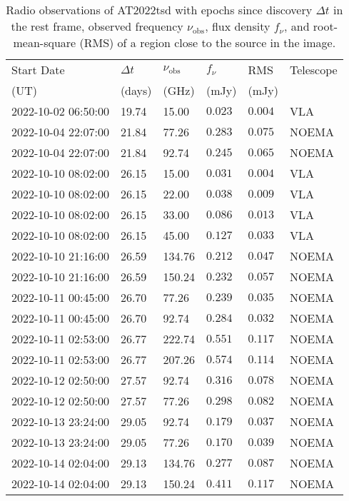 \documentclass{nature_plusfigure}
\begin{document}
\begin{supplement}
\begin{center} 
\begin{longtable}{llllll} 
\caption{Radio observations of AT2022tsd with epochs since discovery $\Delta t$ in the rest frame, observed frequency $\nu_\mathrm{obs}$, flux density $f_\nu$, and root-mean-square (RMS) of a region close to the source in the image.} 
\label{tab:radio-observations}\\ 
\hline\hline
Start Date & $\Delta t$ & $\nu_\mathrm{obs}$ & $f_\nu$ & RMS & Telescope\\ 
(UT) & (days) & (GHz) & (mJy) & (mJy) & \\ 
\hline
2022-10-02 06:50:00 & 19.74 & 15.00 & $0.023$ & $0.004$ & VLA \\ 
2022-10-04 22:07:00 & 21.84 & 77.26 & $0.283$ & $0.075$ & NOEMA \\ 
2022-10-04 22:07:00 & 21.84 & 92.74 & $0.245$ & $0.065$ & NOEMA \\ 
2022-10-10 08:02:00 & 26.15 & 15.00 & $0.031$ & $0.004$ & VLA \\ 
2022-10-10 08:02:00 & 26.15 & 22.00 & $0.038$ & $0.009$ & VLA \\ 
2022-10-10 08:02:00 & 26.15 & 33.00 & $0.086$ & $0.013$ & VLA \\ 
2022-10-10 08:02:00 & 26.15 & 45.00 & $0.127$ & $0.033$ & VLA \\ 
2022-10-10 21:16:00 & 26.59 & 134.76 & $0.212$ & $0.047$ & NOEMA \\ 
2022-10-10 21:16:00 & 26.59 & 150.24 & $0.232$ & $0.057$ & NOEMA \\ 
2022-10-11 00:45:00 & 26.70 & 77.26 & $0.239$ & $0.035$ & NOEMA \\ 
2022-10-11 00:45:00 & 26.70 & 92.74 & $0.284$ & $0.032$ & NOEMA \\ 
2022-10-11 02:53:00 & 26.77 & 222.74 & $0.551$ & $0.117$ & NOEMA \\ 
2022-10-11 02:53:00 & 26.77 & 207.26 & $0.574$ & $0.114$ & NOEMA \\ 
2022-10-12 02:50:00 & 27.57 & 92.74 & $0.316$ & $0.078$ & NOEMA \\ 
2022-10-12 02:50:00 & 27.57 & 77.26 & $0.298$ & $0.082$ & NOEMA \\ 
2022-10-13 23:24:00 & 29.05 & 92.74 & $0.179$ & $0.037$ & NOEMA \\ 
2022-10-13 23:24:00 & 29.05 & 77.26 & $0.170$ & $0.039$ & NOEMA \\ 
2022-10-14 02:04:00 & 29.13 & 134.76 & $0.277$ & $0.087$ & NOEMA \\ 
2022-10-14 02:04:00 & 29.13 & 150.24 & $0.411$ & $0.117$ & NOEMA \\ 

\end{longtable}
\end{center}
\end{supplement}
\end{document}
